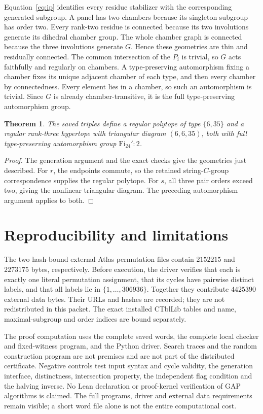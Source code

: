 \documentclass[11pt]{article}
\newtheorem{theorem}{Theorem}
\newcommand{\Fi}{\mathrm{Fi}}
\begin{document}
Equation~\eqref{eq:ip} identifies every residue stabilizer with the corresponding generated subgroup. A panel has two chambers because its singleton subgroup has order two. Every rank-two residue is connected because its two involutions generate its dihedral chamber group. The whole chamber graph is connected because the three involutions generate $G$. Hence these geometries are thin and residually connected. The common intersection of the $P_i$ is trivial, so $G$ acts faithfully and regularly on chambers. A type-preserving automorphism fixing a chamber fixes its unique adjacent chamber of each type, and then every chamber by connectedness. Every element lies in a chamber, so such an automorphism is trivial. Since $G$ is already chamber-transitive, it is the full type-preserving automorphism group.

\begin{theorem}
The saved triples define a regular polytope of type $\{6,35\}$ and a regular rank-three hypertope with triangular diagram $(6,6,35)$, both with full type-preserving automorphism group $\Fi_{24}':2$.
\end{theorem}
\begin{proof}
The generation argument and the exact checks give the geometries just described. For $r$, the endpoints commute, so the retained string-$C$-group correspondence supplies the regular polytope. For $s$, all three pair orders exceed two, giving the nonlinear triangular diagram. The preceding automorphism argument applies to both.
\end{proof}
\section{Reproducibility and limitations}
The two hash-bound external Atlas permutation files contain $2152215$ and $2273175$ bytes, respectively. Before execution, the driver verifies that each is exactly one literal permutation assignment, that its cycles have pairwise distinct labels, and that all labels lie in $\{1,\ldots,306936\}$. Together they contribute $4425390$ external data bytes. Their URLs and hashes are recorded; they are not redistributed in this packet. The exact installed CTblLib tables and name, maximal-subgroup and order indices are bound separately.

The proof computation uses the complete saved words, the complete local checker and fixed-witness program, and the Python driver. Search traces and the random construction program are not premises and are not part of the distributed certificate. Negative controls test input syntax and cycle validity, the generation interface, distinctness, intersection property, the independent flag condition and the halving inverse. No Lean declaration or proof-kernel verification of GAP algorithms is claimed. The full programs, driver and external data requirements remain visible; a short word file alone is not the entire computational cost.
\end{document}

